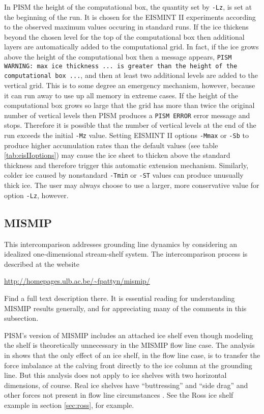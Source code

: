 In PISM the height of the computational box, the quantity set by \texttt{-Lz}, is set at the beginning of the run.  It is chosen for the EISMINT II experiments according to the observed maximum values occuring in standard runs.  If the ice thickens beyond the chosen level for the top of the computational box then additional layers are automatically added to the computational grid.  In fact, if the ice grows above the height of the computational box then a message appears, \texttt{PISM WARNING: max ice thickness ... is greater than the height of the computational box ...}, and then at least two additional levels are added to the vertical grid.  This is to some degree an emergency mechanism, however, because it can run away to use up all memory in extreme cases.  If the height of the computational box grows so large that the grid has more than twice the original number of vertical levels then PISM produces a \texttt{PISM ERROR} error message and stops.   Therefore it is possible that the number of vertical levels at the end of the run exceeds the initial \texttt{-Mz} value.  Setting EISMINT II options \texttt{-Mmax} or \texttt{-Sb} to produce higher accumulation rates than the default values (see table \ref{tab:eisIIoptions}) may cause the ice sheet to thicken above the standard thickness and therefore trigger this automatic extension mechanism.  Similarly, colder ice caused by nonstandard \texttt{-Tmin} or \texttt{-ST} values can produce unusually thick ice.  The user may always choose to use a larger, more conservative value for option \texttt{-Lz}, however.


\subsection{MISMIP}\label{subsect:MISMIP}

This intercomparison addresses grounding line dynamics by considering an idealized one-dimensional stream-shelf system.  The intercomparison process is described at the website

\centerline{\url{http://homepages.ulb.ac.be/~fpattyn/mismip/}}

\noindent Find a full text description there.  It is essential reading for understanding MISMIP results generally, and for appreciating many of the comments in this subsection.

PISM's version of MISMIP includes an attached ice shelf even though modeling the shelf is theoretically unnecessary in the MISMIP flow line case.  The analysis in \cite{SchoofMarine1} shows that the only effect of an ice shelf, in the flow line case, is to transfer the force imbalance at the calving front directly to the ice column at the grounding line.  But this analysis does not apply to ice shelves with two horizontal dimensions, of course.  Real ice shelves have ``buttressing'' and ``side drag'' and other forces not present in flow line circumstances \cite{Goldbergetal2009}.  See the Ross ice shelf example in section \ref{sec:ross}, for example.

